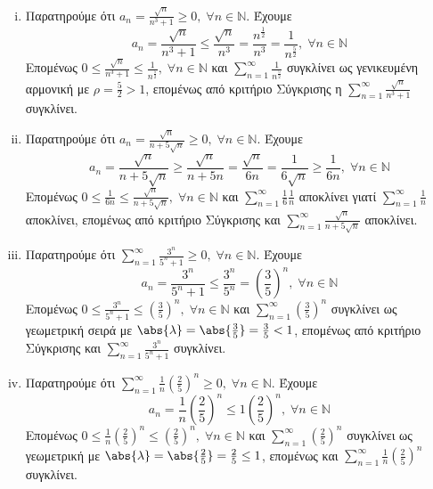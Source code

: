 \documentclass[a4paper,table]{report}
\begin{document}
\begin{enumerate}
\begin{enumerate}[i)]
      \item Παρατηρούμε ότι $ a_{n} = \frac{\sqrt{n}}{n^{3}+1} \geq 0, \; 
        \forall n \in \mathbb{N} $. Έχουμε
        \[
          a_{n} = \frac{\sqrt{n}}{n^{3}+1} \leq \frac{\sqrt{n}}{n^{3}} =
          \frac{n^{\frac{1}{2}}}{n^{3}} = \frac{1}{n^{\frac{5}{2}}}, \; 
          \forall n \in \mathbb{N}
        \] 
        Επομένως $ 0 \leq \frac{\sqrt{n}}{n^{3}+1} \leq \frac{1}{n^{\frac{5}{2}}}, 
        \; \forall n \in \mathbb{N}$ και $ \sum_{n=1}^{\infty} 
        \frac{1}{n^{\frac{5}{2} }}$ συγκλίνει ως γενικευμένη αρμονική με 
        $ \rho = \frac{5}{2} > 1 $, επομένως από κριτήριο Σύγκρισης η 
        $ \sum_{n=1}^{\infty} \frac{\sqrt{n}}{n^{3}+1} $ συγκλίνει.

      \item Παρατηρούμε ότι $ a_{n} = \frac{\sqrt{n}}{n + 5 \sqrt{n}} \geq 0, \; 
        \forall n \in \mathbb{N}$. Έχουμε
        \[
          a_{n} = \frac{\sqrt{n}}{n+ 5 \sqrt{n}} \geq \frac{\sqrt{n}}{n+ 5n} = 
          \frac{\sqrt{n}}{6n} = \frac{1}{6 \sqrt{n}} \geq \frac{1}{6n}, 
          \; \forall n \in \mathbb{N}
        \] 
        Επομένως $ 0 \leq \frac{1}{6n} \leq \frac{\sqrt{n}}{n+ 5 \sqrt{n}}, \; 
        \forall n \in \mathbb{N} $ και 
        $ \sum_{n=1}^{\infty} \frac{1}{6} \frac{1}{n} $ αποκλίνει γιατί 
        $ \sum_{n=1}^{\infty} \frac{1}{n} $ αποκλίνει, επομένως από κριτήριο 
        Σύγκρισης και $ \sum_{n=1}^{\infty} \frac{\sqrt{n}}{n+ 5 \sqrt{n}} $ 
        αποκλίνει.

      \item Παρατηρούμε ότι $ \sum_{n=1}^{\infty} \frac{3^{n}}{5^{n}+1} \geq 0, 
        \; \forall n \in \mathbb{N}$. Έχουμε
        \[
          a_{n} = \frac{3^{n}}{5^{n}+1} \leq \frac{3^{n}}{5^{n}} = 
          \left(\frac{3}{5}\right)^{n}, \; \forall n \in \mathbb{N} 
        \] 
        Επομένως $ 0 \leq \frac{3^{n}}{5^{n}+1} \leq \left(\frac{3}{5} \right)^{n},
        \; \forall n \in \mathbb{N} $ και $ \sum_{n=1}^{\infty} 
        \left(\frac{3}{5} \right)^{n}$
        συγκλίνει ως γεωμετρική σειρά με $ \abs{\lambda} = \abs{\frac{3}{5}} = 
        \frac{3}{5} < 1 $, επομένως από κριτήριο Σύγκρισης και 
        $ \sum_{n=1}^{\infty} \frac{3^{n}}{5^{n}+1} $ συγκλίνει.

      \item Παρατηρούμε ότι $ \sum_{n=1}^{\infty} \frac{1}{n} 
        \left(\frac{2}{5} \right)^{n} \geq 0, \; \forall n \in \mathbb{N} $. Έχουμε
        \[
          a_{n} = \frac{1}{n} \left(\frac{2}{5} \right)^{n} \leq 1
          \left(\frac{2}{5} \right)^{n}, \; \forall n \in \mathbb{N}
        \] 
        Επομένως $ 0 \leq \frac{1}{n} \left(\frac{2}{5} \right)^{n} \leq 
        \left(\frac{2}{5}\right)^{n}, \; \forall n \in \mathbb{N}$ και 
        $ \sum_{n=1}^{\infty} \left(\frac{2}{5} \right)^{n} $ συγκλίνει 
        ως γεωμετρική με $ \abs{\lambda} = \abs{\frac{2}{5}} = \frac{2}{5} \leq 1$,
        επομένως και $ \sum_{n=1}^{\infty} \frac{1}{n} \left(\frac{2}{5} 
        \right)^{n} $ συγκλίνει.


\end{enumerate}
\end{enumerate}
\end{document}
